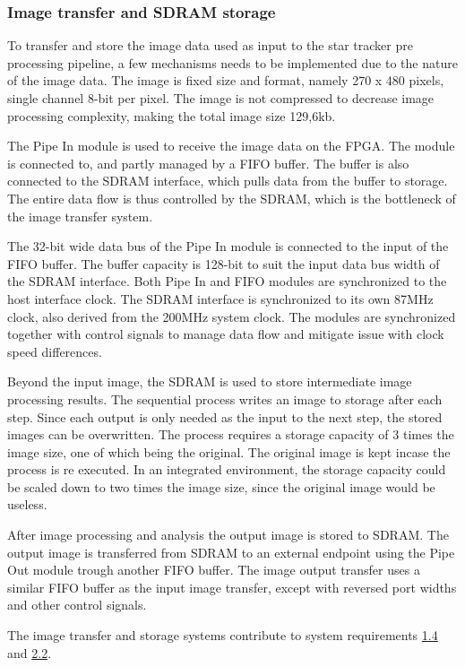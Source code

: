 \documentclass[12pt]{report}
\begin{document}
\subsubsection{Image transfer and SDRAM storage}
To transfer and store the image data used as input to the star tracker pre processing pipeline, a few mechanisms needs to be implemented due to the nature of the image data. The image is fixed size and format, namely 270 x 480 pixels, single channel 8-bit per pixel. The image is not compressed to decrease image processing complexity, making the total image size 129,6kb.
\par
The Pipe In module is used to receive the image data on the FPGA. The module is connected to, and partly managed by a FIFO buffer. The buffer is also connected to the SDRAM interface, which pulls data from the buffer to storage. The entire data flow is thus controlled by the SDRAM, which is the bottleneck of the image transfer system.
\par
The 32-bit wide data bus of the Pipe In module is connected to the input of the FIFO buffer. The buffer capacity is 128-bit to suit the input data bus width of the SDRAM interface. Both Pipe In and FIFO modules are synchronized to the host interface clock. The SDRAM interface is synchronized to its own 87MHz clock, also derived from the 200MHz system clock. The modules are synchronized together with control signals to manage data flow and mitigate issue with clock speed differences.
\par
Beyond the input image, the SDRAM is used to store intermediate image processing results. The sequential process writes an image to storage after each step. Since each output is only needed as the input to the next step, the stored images can be overwritten. The process requires a storage capacity of 3 times the image size, one of which being the original. The original image is kept incase the process is re executed. In an integrated environment, the storage capacity could be scaled down to two times the image size, since the original image would be useless.
\par
After image processing and analysis the output image is stored to SDRAM. The output image is transferred from SDRAM to an external endpoint using the Pipe Out module trough another FIFO buffer. The image output transfer uses a similar FIFO buffer as the input image transfer, except with reversed port widths and other control signals.   
\par
The image transfer and storage systems contribute to system requirements \hyperref[req1.4]{1.4} and \hyperref[req2.2]{2.2}.
\end{document}
